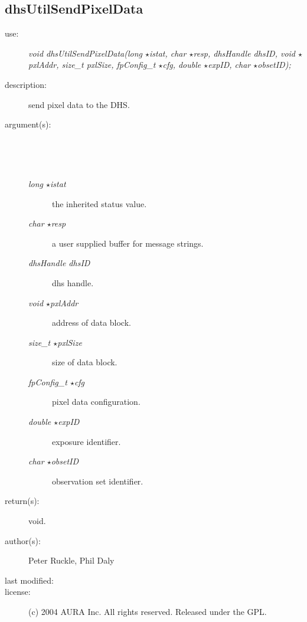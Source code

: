 \subsection {dhsUtilSendPixelData} \begin{description} \item[\sc use:] \emph{void dhsUtilSendPixelData(long $\star$istat, char $\star$resp, dhsHandle dhsID, void $\star$pxlAddr, size\_t pxlSize, fpConfig\_t $\star$cfg, double $\star$expID, char $\star$obsetID);} \item[\sc description:] send pixel data to the DHS. \item[\sc argument(s):] \begin{description} \item[\ ] \ \item[\emph{long $\star$istat}] the inherited status value. \item[\emph{char $\star$resp}] a user supplied buffer for message strings. \item[\emph{dhsHandle dhsID}] dhs handle. \item[\emph{void $\star$pxlAddr}] address of data block. \item[\emph{size\_t $\star$pxlSize}] size of data block. \item[\emph{fpConfig\_t $\star$cfg}] pixel data configuration. \item[\emph{double $\star$expID}] exposure identifier. \item[\emph{char $\star$obsetID}] observation set identifier. \end{description} \item[\sc return(s):] void. \item[\sc author(s):] Peter Ruckle, Phil Daly \item[\sc last modified:] \item[\sc license:] (c) 2004 AURA Inc. All rights reserved. Released under the GPL. \end{description}
